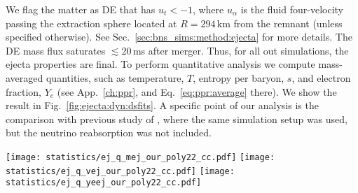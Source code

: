 We flag the matter as \ac{DE} that has $u_t < -1$, where $u_{\alpha}$ is the 
fluid four-velocity passing the extraction sphere located at $R=294\,$km 
from the remnant (unless specified otherwise).
See Sec.~\ref{sec:bns_sims:method:ejecta} for more details.
%
The \ac{DE} mass flux saturates ${\lesssim}20\,$ms after merger.
Thus, for all out simulations, the ejecta properties are final.
%
To perform quantitative analysis we compute mass-averaged quantities, such 
as temperature, $T$, entropy per baryon, $s$, and electron fraction, $Y_e$ 
(see App.~\ref{ch:ppr}, and Eq.~\ref{eq:ppr:average} there).
%
We show the result in Fig.~\ref{fig:ejecta:dyn:dsfits}.
A specific point of our analysis is the comparison with previous study of 
\citet{Radice:2018pdn}, where the same simulation setup was used, but 
the neutrino reabsorption was not included.
%
\begin{figure*}[t]
    \centering 
    \texttt{[image: statistics/ej\_q\_mej\_our\_poly22\_cc.pdf]}
    \texttt{[image: statistics/ej\_q\_vej\_our\_poly22\_cc.pdf]}
    \texttt{[image: statistics/ej\_q\_yeej\_our\_poly22\_cc.pdf]}
    \caption{Dynamical ejecta properties as a function of mass ratio
        and reduced tidal parameter. The dependency on the latter is
        color coded. From left to right the main panels show the total
        mass, the mass-averaged velocity and the electron fraction.
        The bottom panels show the relative difference between the data
        and the fit polynomial fit discussed in the text.
        (Adapted from \citet{Nedora:2020pak})
    }
    \label{fig:ejecta:dyn:dsfits}
\end{figure*}
%




